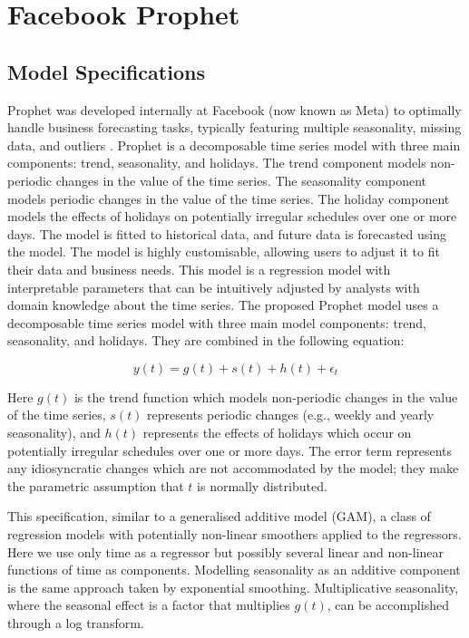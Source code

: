 \documentclass[mstat,12pt]{unswthesis}
\begin{document}
\section{Facebook Prophet}\label{facebook-prophet}

\subsection{Model Specifications}\label{model-specifications}

Prophet was developed internally at Facebook (now known as Meta) to
optimally handle business forecasting tasks, typically featuring
multiple seasonality, missing data, and outliers
\cite{taylor2017facebook}. Prophet is a decomposable time series model
with three main components: trend, seasonality, and holidays. The trend
component models non-periodic changes in the value of the time series.
The seasonality component models periodic changes in the value of the
time series. The holiday component models the effects of holidays on
potentially irregular schedules over one or more days. The model is
fitted to historical data, and future data is forecasted using the
model. The model is highly customisable, allowing users to adjust it to
fit their data and business needs. This model is a regression model with
interpretable parameters that can be intuitively adjusted by analysts
with domain knowledge about the time series. The proposed Prophet model
uses a decomposable time series model with three main model components:
trend, seasonality, and holidays. They are combined in the following
equation:

\[
y(t) = g(t) + s(t) + h(t) + \epsilon_t
\]

Here \(g(t)\) is the trend function which models non-periodic changes in
the value of the time series, \(s(t)\) represents periodic changes
(e.g., weekly and yearly seasonality), and \(h(t)\) represents the
effects of holidays which occur on potentially irregular schedules over
one or more days. The error term represents any idiosyncratic changes
which are not accommodated by the model; they make the parametric
assumption that \(t\) is normally distributed.

This specification, similar to a generalised additive model (GAM), a
class of regression models with potentially non-linear smoothers applied
to the regressors. Here we use only time as a regressor but possibly
several linear and non-linear functions of time as components. Modelling
seasonality as an additive component is the same approach taken by
exponential smoothing. Multiplicative seasonality, where the seasonal
effect is a factor that multiplies \(g(t)\), can be accomplished through
a log transform.
\end{document}
